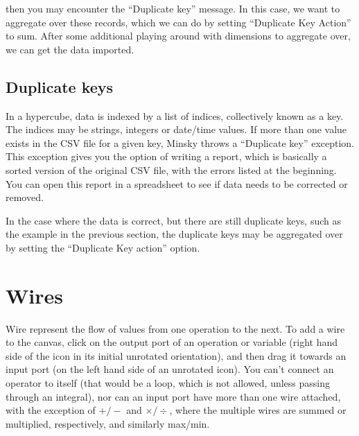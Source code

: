 then you may encounter the ``Duplicate key'' message. In this case, we want
to aggregate over these records, which we can do by setting
``Duplicate Key Action'' to sum. After some additional playing around
with dimensions to aggregate over, we can get the data imported.

\begin{center}
\end{center}

\subsection{Duplicate keys}

In a hypercube, data is indexed by a list of indices, collectively
known as a key. The indices may be strings, integers or date/time
values. If more than one value exists in the CSV file for a given key,
Minsky throws a ``Duplicate key'' exception. This exception gives you
the option of writing a report, which is basically a sorted version of
the original CSV file, with the errors listed at the beginning. You
can open this report in a spreadsheet to see if data needs to be
corrected or removed. 

In the case where the data is correct, but there are still duplicate
keys, such as the example in the previous section, the duplicate keys
may be aggregated over by setting the ``Duplicate Key action'' option.

\section{Wires}

Wire represent the flow of values from one operation to the next. To
add a wire to the canvas, click on the output port of an operation or
variable (right hand side of the icon in its initial unrotated
orientation), and then drag it towards an input port (on the left hand
side of an unrotated icon). You can't connect an operator to itself
(that would be a loop, which is not allowed, unless passing through an
integral), nor can an input port have more than one wire
attached, with the exception of $+/-$ and $\times/\div$, where the
multiple wires are summed or multiplied, respectively, and similarly max/min.

